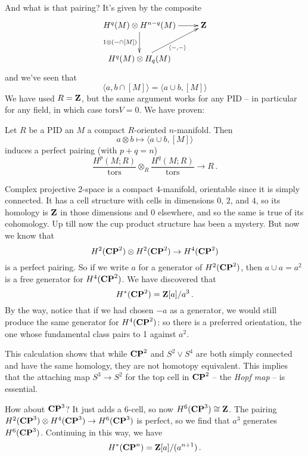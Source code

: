 And what is that pairing? It's given by the composite
\begin{equation*}
\xymatrix{
	H^q(M)\otimes H^{n-q}(M)\ar[r]\ar[d]_{1\otimes(-\cap [M])} & \Z\\
	H^q(M)\otimes H_q(M)\ar[ur]_{\langle-,-\rangle}
}
\end{equation*}
and we've seen that 
\begin{equation*}
\langle a,b\cap [M]\rangle = \langle a\cup b,[M]\rangle
\end{equation*}
We have used $R=\mathbf Z$, but the same argument works for any PID -- in particular
for any field, in which case $\mathrm{tors}V=0$. We have proven:
\begin{theorem} Let $R$ be a PID an $M$ a compact $R$-oriented $n$-manifold. 
Then 
\begin{equation*}
a\otimes b\mapsto\langle a\cup b,[M]\rangle
\end{equation*}
induces a perfect pairing (with $p+q=n$)
\[
\frac{H^p(M;R)}{\mathrm{tors}}\otimes_R\frac{H^q(M;R)}{\mathrm{tors}}\to R\,.
\]
\end{theorem}
\begin{example}
Complex projective 2-space is a compact 4-manifold, orientable since it is 
simply 
connected. It has a cell structure with cells in dimensions $0$, $2$, and $4$,
so its homology is $\mathbf Z$ in those dimensions and 0 elsewhere, and so the same is
true of its cohomology. Up till now the cup product structure has been a 
mystery. But now we know that 
\[
H^2(\mathbf{CP}^2)\otimes H^2(\mathbf{CP}^2)\to H^4(\mathbf{CP}^2)
\]
is a perfect pairing. So if we write $a$ for a generator of $H^2(\mathbf{CP}^2)$,
then $a\cup a=a^2$ is a free generator for $H^4(\mathbf{CP}^2)$. We have discovered 
that 
\[
H^*(\mathbf{CP}^2)=\mathbf Z[a]/a^3\,.
\]
By the way, notice that if we had chosen $-a$ as a generator, we would still
produce the same generator for $H^4(\mathbf{CP}^2)$: so there is a preferred
orientation, the one whose fundamental class pairs to 1 against $a^2$. 

This calculation shows that while $\mathbf{CP}^2$ and $S^2\vee S^4$ are both
simply connected and have the same homology, they are not homotopy
equivalent. This implies that the attaching map $S^3\to S^2$ for the top
cell in $\mathbf{CP}^2$ -- the {\em Hopf map} -- is essential.

How about $\mathbf{CP}^3$? It just adds a $6$-cell, so now $H^6(\mathbf{CP}^3)\cong\mathbf Z$.
The pairing $H^2(\mathbf{CP}^3)\otimes H^4(\mathbf{CP}^3)\to H^6(\mathbf{CP}^3)$ is perfect, so we
find that $a^3$ generates $H^6(\mathbf{CP}^3)$. Continuing in this way, we have
\[
H^\ast(\mathbf{CP}^n)=\mathbf Z[a]/(a^{n+1})\,.
\]
\end{example}
